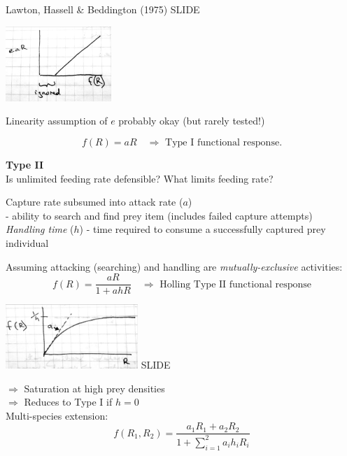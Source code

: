 \documentclass{article}
\newcommand{\note}[1]{\colorbox{gray!30}{#1}}
\newcommand{\ind}{\-\hspace{1cm}}
\begin{document}
\pagebreak
Lawton, Hassell \& Beddington (1975) \note{SLIDE}
\begin{center}
\includegraphics[width=4cm]{figs/FR_conv.pdf}
\end{center}
Linearity assumption of $e$ probably okay (but rarely tested!)

\begin{equation*}
	f(R) = a R   \quad \Rightarrow \text{ Type I functional response}. 
\end{equation*}

\textbf{Type II}\\
Is unlimited feeding rate defensible?  What limits feeding rate?

\ind Capture rate subsumed into attack rate ($a$)\\
\ind \ind - ability to search and find prey item (includes failed capture attempts)\\
\ind \emph{Handling time} ($h$) - time required to consume a successfully captured prey individual

Assuming attacking (searching) and handling are \emph{mutually-exclusive} activities:
\begin{equation*}
	f(R)=\frac{aR}{1+ahR} \quad  \Rightarrow \text{ Holling Type II functional response}
\end{equation*}


\includegraphics[width=5cm]{figs/FR_T2.pdf} \note{SLIDE}

\ind $\Rightarrow$ Saturation at high prey densities\\
\ind $\Rightarrow$ Reduces to Type I if $h=0$\\

Multi-species extension:\\
\begin{equation*}
	f(R_1,R_2)=\frac{a_1 R_1 + a_2 R_2}{1+\sum_{i=1}^2 a_i h_i R_i}
\end{equation*}
\end{document}
